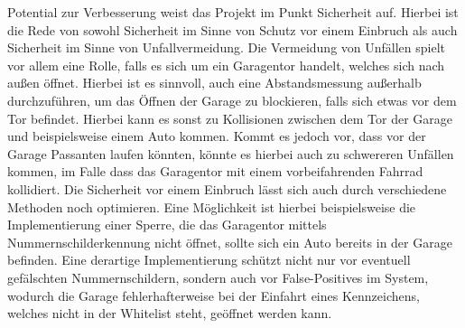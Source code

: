 Potential zur Verbesserung weist das Projekt im Punkt Sicherheit auf. Hierbei ist die Rede von sowohl Sicherheit im Sinne von Schutz vor einem Einbruch als auch Sicherheit im Sinne von Unfallvermeidung. Die Vermeidung von Unfällen spielt vor allem eine Rolle, falls es sich um ein Garagentor handelt, welches sich nach außen öffnet. Hierbei ist es sinnvoll, auch eine Abstandsmessung außerhalb durchzuführen, um das Öffnen der Garage zu blockieren, falls sich etwas vor dem Tor befindet. Hierbei kann es sonst zu Kollisionen zwischen dem Tor der Garage und beispielsweise einem Auto kommen. Kommt es jedoch vor, dass vor der Garage Passanten laufen könnten, könnte es hierbei auch zu schwereren Unfällen kommen, im Falle dass das Garagentor mit einem vorbeifahrenden Fahrrad kollidiert.
Die Sicherheit vor einem Einbruch lässt sich auch durch verschiedene Methoden noch optimieren. Eine Möglichkeit ist hierbei beispielsweise die Implementierung einer Sperre, die das Garagentor mittels Nummernschilderkennung nicht öffnet, sollte sich ein Auto bereits in der Garage befinden. Eine derartige Implementierung schützt nicht nur vor eventuell gefälschten Nummernschildern, sondern auch vor False-Positives im System, wodurch die Garage fehlerhafterweise bei der Einfahrt eines Kennzeichens, welches nicht in der Whitelist steht, geöffnet werden kann. 
